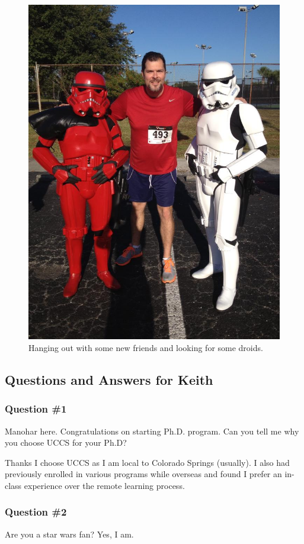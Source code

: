\begin{figure}
	\centering
	\caption{Hanging out with some new friends and looking for some droids.}
	\label{fig:PaulsonLittleTall}
	\includegraphics[width=0.7\linewidth]{PaulsonLittleTall}
\end{figure}

    \subsection{Questions and Answers for Keith}
    \subsubsection {Question \#1}
		Manohar here. Congratulations on starting Ph.D. program. Can you tell me why you choose UCCS for your Ph.D?
		
		Thanks I choose UCCS as I am local to Colorado Springs (usually). I also had previously enrolled in various programs while overseas and found I prefer an in-class experience over the remote learning process. 

    \subsubsection {Question \#2}

	  Are you a star wars fan?
	  	  Yes, I am.\\